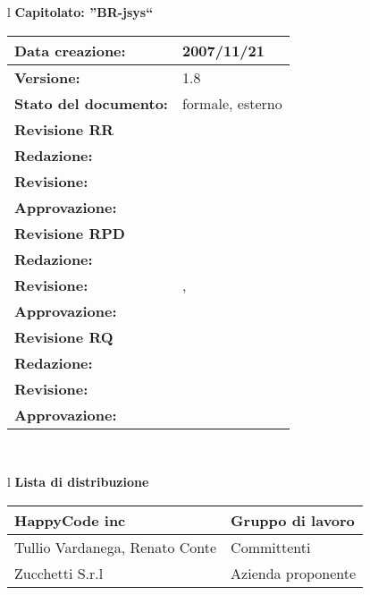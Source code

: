 

\newcommand{\lv}{ 1.8 } %
\newcommand{\dt}{ Piano Di Progetto }%
\newcommand{\Glossario}{ Glossario.1.8.pdf }


\begin{center}
\thispagestyle{plain}
\begin{table}[htbp]

\large{
\begin{tabular}{l}
\Large{\textbf{\textsf{Capitolato: ''BR-jsys``}}} \\
\begin{tabular}{|p{6cm}|p{6cm}|} \hline
\textbf{Data creazione:} & 2007/11/21 \\ \hline
\textbf{Versione:} & \lv \\ \hline
\textbf{Stato del documento:} & formale, esterno \\ \hline
\textbf{Revisione RR} &  \\ \hline
\textbf{Redazione:} & \ET \\ \hline
\textbf{Revisione:} & \MT \\ \hline
\textbf{Approvazione:} & \ET \\ \hline
\textbf{Revisione RPD} &    \\ \hline
\textbf{Redazione:} & \MM \\ \hline
\textbf{Revisione:} & \ET , \FC \\ \hline
\textbf{Approvazione:}  & \MM \\  \hline
\textbf{Revisione RQ} &    \\ \hline
\textbf{Redazione:} & \ET \\ \hline
\textbf{Revisione:} & \\ \hline
\textbf{Approvazione:}  & \\  \hline
\end{tabular} \\
\end{tabular}
}
\end{table}

\begin{table}[hbtp]
\large{
\begin{tabular}{l}
\Large{\textbf{\textsf{Lista di distribuzione}}} \\
\begin{tabular}{|p{6cm}|p{6cm}|} \hline
{HappyCode inc}& Gruppo di lavoro\\ \hline
{Tullio Vardanega, Renato Conte}& Committenti \\ \hline 
{Zucchetti S.r.l}& Azienda proponente\\ \hline
\end{tabular} \\
\end{tabular}
}
\end{table}
\begin{table}[hbtp]


\end{table}
\end{center}
